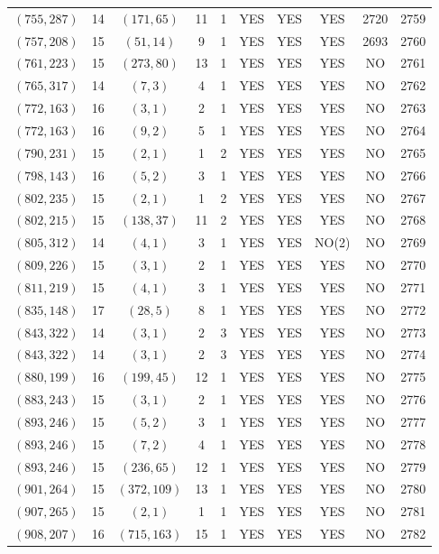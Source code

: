 \begin{longtable}{|c|c|c|c|c|c|c|c|c|c|}
$(755, 287)$ & 14 & $(171, 65)$ & 11 & 1 & YES & YES & YES & 2720 & 2759\\
$(757, 208)$ & 15 & $(51, 14)$ & 9 & 1 & YES & YES & YES & 2693 & 2760\\
$(761, 223)$ & 15 & $(273, 80)$ & 13 & 1 & YES & YES & YES & NO & 2761\\
$(765, 317)$ & 14 & $(7, 3)$ & 4 & 1 & YES & YES & YES & NO & 2762\\
$(772, 163)$ & 16 & $(3, 1)$ & 2 & 1 & YES & YES & YES & NO & 2763\\
$(772, 163)$ & 16 & $(9, 2)$ & 5 & 1 & YES & YES & YES & NO & 2764\\
$(790, 231)$ & 15 & $(2, 1)$ & 1 & 2 & YES & YES & YES & NO & 2765\\
$(798, 143)$ & 16 & $(5, 2)$ & 3 & 1 & YES & YES & YES & NO & 2766\\
$(802, 235)$ & 15 & $(2, 1)$ & 1 & 2 & YES & YES & YES & NO & 2767\\
$(802, 215)$ & 15 & $(138, 37)$ & 11 & 2 & YES & YES & YES & NO & 2768\\
$(805, 312)$ & 14 & $(4, 1)$ & 3 & 1 & YES & YES & NO(2) & NO & 2769\\
$(809, 226)$ & 15 & $(3, 1)$ & 2 & 1 & YES & YES & YES & NO & 2770\\
$(811, 219)$ & 15 & $(4, 1)$ & 3 & 1 & YES & YES & YES & NO & 2771\\
$(835, 148)$ & 17 & $(28, 5)$ & 8 & 1 & YES & YES & YES & NO & 2772\\
$(843, 322)$ & 14 & $(3, 1)$ & 2 & 3 & YES & YES & YES & NO & 2773\\
$(843, 322)$ & 14 & $(3, 1)$ & 2 & 3 & YES & YES & YES & NO & 2774\\
$(880, 199)$ & 16 & $(199, 45)$ & 12 & 1 & YES & YES & YES & NO & 2775\\
$(883, 243)$ & 15 & $(3, 1)$ & 2 & 1 & YES & YES & YES & NO & 2776\\
$(893, 246)$ & 15 & $(5, 2)$ & 3 & 1 & YES & YES & YES & NO & 2777\\
$(893, 246)$ & 15 & $(7, 2)$ & 4 & 1 & YES & YES & YES & NO & 2778\\
$(893, 246)$ & 15 & $(236, 65)$ & 12 & 1 & YES & YES & YES & NO & 2779\\
$(901, 264)$ & 15 & $(372, 109)$ & 13 & 1 & YES & YES & YES & NO & 2780\\
$(907, 265)$ & 15 & $(2, 1)$ & 1 & 1 & YES & YES & YES & NO & 2781\\
$(908, 207)$ & 16 & $(715, 163)$ & 15 & 1 & YES & YES & YES & NO & 2782\\

\end{longtable}
